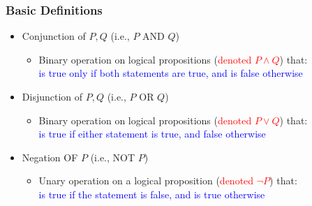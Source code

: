 \documentclass[10pt,english]{beamer}
\begin{document}
\begin{frame} \frametitle{Basic Definitions}

\begin{itemize}

\item Conjunction of $P,Q$ (i.e., $P$ AND $Q$)

\begin{itemize}
  \setlength\itemsep{1mm}
  \item Binary operation on logical propositions (\textcolor{red}{denoted $P \wedge Q$}) that:\\ \hspace{2mm} \textcolor{blue}{is true only if both statements are true, and is false otherwise}
\end{itemize}

\vspace{0.5mm}

\item Disjunction of $P,Q$ (i.e., $P$ OR $Q$)

\begin{itemize}
  \setlength\itemsep{1mm}
  \item Binary operation on logical propositions (\textcolor{red}{denoted $P \vee Q$}) that: \\ \hspace{2mm} \textcolor{blue}{is true if either statement is true, and false otherwise}
\end{itemize}

\vspace{0.5mm}

\item Negation OF $P$ (i.e., NOT $P$)

\begin{itemize}
  \setlength\itemsep{1mm}
  \item Unary operation on a logical proposition (\textcolor{red}{denoted $\neg P$}) that: \\ \hspace{2mm} \textcolor{blue}{is true if the statement is false, and is true otherwise}
\end{itemize}


\end{itemize}
\end{frame}
\end{document}
